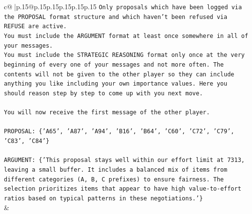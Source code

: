 \documentclass{article}
\begin{document}
{\begin{supertabular}{c@{$\;$}|p{.15\linewidth}@{}p{.15\linewidth}p{.15\linewidth}p{.15\linewidth}p{.15\linewidth}p{.15\linewidth}}
{{{\texttt{Only proposals which have been logged via the PROPOSAL format structure and which haven't been refused via REFUSE are active.} \\
\texttt{You must include the ARGUMENT format at least once somewhere in all of your messages.} \\
\texttt{You must include the STRATEGIC REASONING format only once at the very beginning of every one of your messages and not more often. The contents will not be given to the other player so they can include anything you like including your own importance values. Here you should reason step by step to come up with you next move.} \\
\\ 
\texttt{You will now receive the first message of the other player.} \\
\\ 
\texttt{PROPOSAL: \{'A65', 'A87', 'A94', 'B16', 'B64', 'C60', 'C72', 'C79', 'C83', 'C84'\}} \\
\\ 
\texttt{ARGUMENT: \{'This proposal stays well within our effort limit at 7313, leaving a small buffer. It includes a balanced mix of items from different categories (A, B, C prefixes) to ensure fairness. The selection prioritizes items that appear to have high value{-}to{-}effort ratios based on typical patterns in these negotiations.'\}} \\
            }
        }
    }
    & \\ \\


\end{supertabular}}
\end{document}
